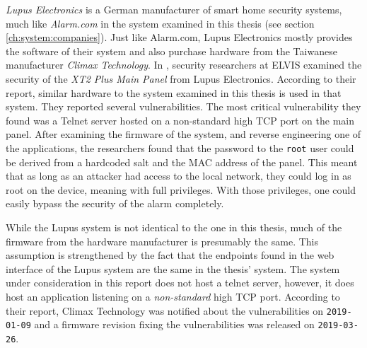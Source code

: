 \textit{Lupus Electronics} is a German manufacturer of smart home security systems, much like \textit{Alarm.com} in the system examined in this thesis (see section \ref{ch:system:companies}). Just like Alarm.com, Lupus Electronics mostly provides the software of their system and also purchase hardware from the Taiwanese manufacturer \textit{Climax Technology}. In \citeyear{labvienna}, security researchers at ELVIS examined the security of the \textit{XT2 Plus Main Panel} from Lupus Electronics. According to their report, similar hardware to the system examined in this thesis is used in that system. They reported several vulnerabilities. The most critical vulnerability they found was a Telnet server hosted on a non-standard high TCP port on the main panel. After examining the firmware of the system, and reverse engineering one of the applications, the researchers found that the password to the \texttt{root} user could be derived from a hardcoded salt and the MAC address of the panel. This meant that as long as an attacker had access to the local network, they could log in as root on the device, meaning with full privileges. With those privileges, one could easily bypass the security of the alarm completely.

While the Lupus system is not identical to the one in this thesis, much of the firmware from the hardware manufacturer is presumably the same. This assumption is strengthened by the fact that the endpoints found in the web interface of the Lupus system are the same in the thesis' system. The system under consideration in this report does not host a telnet server, however, it does host an application listening on a \textit{non-standard} high TCP port. According to their report, Climax Technology was notified about the vulnerabilities on \texttt{2019-01-09} and a firmware revision fixing the vulnerabilities was released on \texttt{2019-03-26}.

